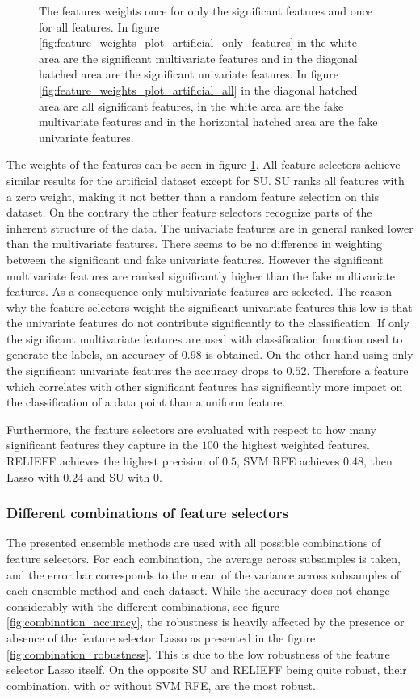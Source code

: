 \documentclass[twoside,11pt]{article}
\begin{document}
\begin{figure}
  \caption{The features weights once for only the significant features and once for all features. In figure \ref{fig:feature_weights_plot_artificial_only_features} in the white area are the significant multivariate features and in the diagonal hatched area are the significant univariate features. In figure \ref{fig:feature_weights_plot_artificial_all} in the diagonal hatched area are all significant features, in the white area are the fake multivariate features and in the horizontal hatched area are the fake univariate features. }
  \label{fig:feature_weights_plot_artificial}
\end{figure}
The weights of the features can be seen in figure \ref{fig:feature_weights_plot_artificial}.
All feature selectors achieve similar results for the artificial dataset except for SU. SU ranks all features with a zero weight, making it not better than a random feature selection on this dataset. On the contrary the other feature selectors recognize parts of the inherent structure of the data. The univariate features are in general ranked lower than the multivariate features. There seems to be no difference in weighting between the significant und fake univariate features. However the significant multivariate features are ranked significantly higher than the fake multivariate features. As a consequence only multivariate features are selected. The reason why the feature selectors weight the significant univariate features this low is that the univariate features do not contribute significantly to the classification. If only the significant multivariate features are used with classification function used to generate the labels, an accuracy of $0.98$ is obtained. On the other hand using only the significant univariate features the accuracy drops to $0.52$. Therefore a feature which correlates with other significant features has significantly more impact on the classification of a data point than a uniform feature.

Furthermore, the feature selectors are evaluated with respect to how many significant features they capture in the $100$ the highest weighted features. RELIEFF achieves the highest precision of $0.5$, SVM RFE achieves $0.48$, then Lasso with $0.24$ and SU with $0$.

\subsubsection{Different combinations of feature selectors}
The presented ensemble methods are used with all possible combinations of feature selectors. For each combination, the average across subsamples  is taken, and the error bar corresponds to the mean of the variance across subsamples of each ensemble method and each dataset. While the accuracy does not change considerably with the different combinations, see figure \ref{fig:combination_accuracy}, the robustness is heavily affected by the presence or absence of the feature selector Lasso as presented in the figure \ref{fig:combination_robustness}. This is due to the low robustness of the feature selector Lasso itself. On the opposite SU and RELIEFF being quite robust, their combination, with or without SVM RFE, are the most robust.  
\end{document}
